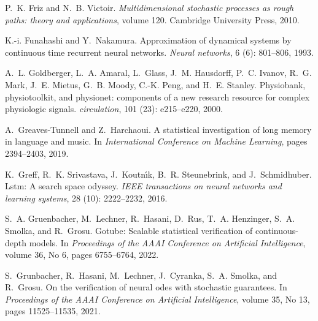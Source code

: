 \documentclass{MITcsail}
\begin{document}
\begin{thebibliography}{96}
P.~K. Friz and N.~B. Victoir.
\newblock \emph{Multidimensional stochastic processes as rough paths: theory
  and applications}, volume 120.
\newblock Cambridge University Press, 2010.

K.-i. Funahashi and Y.~Nakamura.
\newblock Approximation of dynamical systems by continuous time recurrent
  neural networks.
\newblock \emph{Neural networks}, 6 (6): 801--806, 1993.

A.~L. Goldberger, L.~A. Amaral, L.~Glass, J.~M. Hausdorff, P.~C. Ivanov, R.~G.
  Mark, J.~E. Mietus, G.~B. Moody, C.-K. Peng, and H.~E. Stanley.
\newblock Physiobank, physiotoolkit, and physionet: components of a new
  research resource for complex physiologic signals.
\newblock \emph{circulation}, 101 (23): e215--e220, 2000.

A.~Greaves-Tunnell and Z.~Harchaoui.
\newblock A statistical investigation of long memory in language and music.
\newblock In \emph{International Conference on Machine Learning}, pages
  2394--2403, 2019.

K.~Greff, R.~K. Srivastava, J.~Koutn{\'\i}k, B.~R. Steunebrink, and
  J.~Schmidhuber.
\newblock Lstm: A search space odyssey.
\newblock \emph{IEEE transactions on neural networks and learning systems},
  28 (10): 2222--2232, 2016.

S.~A. Gruenbacher, M.~Lechner, R.~Hasani, D.~Rus, T.~A. Henzinger, S.~A.
  Smolka, and R.~Grosu.
\newblock Gotube: Scalable statistical verification of continuous-depth models.
\newblock In \emph{Proceedings of the AAAI Conference on Artificial
  Intelligence}, volume 36, No 6, pages 6755--6764, 2022.

S.~Grunbacher, R.~Hasani, M.~Lechner, J.~Cyranka, S.~A. Smolka, and R.~Grosu.
\newblock On the verification of neural odes with stochastic guarantees.
\newblock In \emph{Proceedings of the AAAI Conference on Artificial
  Intelligence}, volume 35, No 13, pages 11525--11535, 2021.


\end{thebibliography}
\end{document}
